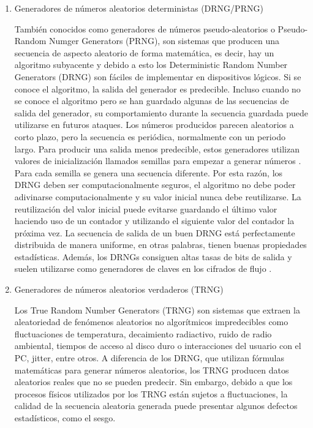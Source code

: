         \begin{enumerate}
            \item Generadores de números aleatorios deterministas (DRNG/PRNG)
            
                También conocidos como generadores de números pseudo-aleatorios o Pseudo-Random Numger Generators (PRNG), son sistemas que producen una secuencia de aspecto aleatorio de forma matemática, es decir, hay un algoritmo subyacente y debido a esto los Deterministic Random Number Generators (DRNG) son fáciles de implementar en dispositivos lógicos. Si se conoce el algoritmo, la salida del generador es predecible. Incluso cuando no se conoce el algoritmo pero se han guardado algunas de las secuencias de salida del generador, su comportamiento durante la secuencia guardada puede utilizarse en futuros ataques. Los números producidos parecen aleatorios a corto plazo, pero la secuencia es periódica, normalmente con un periodo largo. Para producir una salida menos predecible, estos generadores utilizan valores de inicialización llamados semillas para empezar a generar números \cite{Nist2010}. Para cada semilla se genera una secuencia diferente. Por esta razón, los DRNG deben ser computacionalmente seguros, el algoritmo no debe poder adivinarse computacionalmente y su valor inicial nunca debe reutilizarse. La reutilización del valor inicial puede evitarse guardando el último valor haciendo uso de un contador y utilizando el siguiente valor del contador la próxima vez. La secuencia de salida de un buen DRNG está perfectamente distribuida de manera uniforme, en otras palabras, tienen buenas propiedades estadísticas. Además, los DRNGs consiguen altas tasas de bits de salida y suelen utilizarse como generadores de claves en los cifrados de flujo \cite{Badrignans2011}.
            
            \item Generadores de números aleatorios verdaderos (TRNG)
            
                Los True Random Number Generators (TRNG) son sistemas que extraen la aleatoriedad de fenómenos aleatorios no algorítmicos impredecibles como fluctuaciones de temperatura, decaimiento radiactivo, ruido de radio ambiental, tiempos de acceso al disco duro o interacciones del usuario con el PC, jitter, entre otros. A diferencia de los DRNG, que utilizan fórmulas matemáticas para generar números aleatorios, los TRNG producen datos aleatorios reales que no se pueden predecir. Sin embargo, debido a que los procesos físicos utilizados por los TRNG están sujetos a fluctuaciones, la calidad de la secuencia aleatoria generada puede presentar algunos defectos estadísticos, como el sesgo.
                

\end{enumerate}
